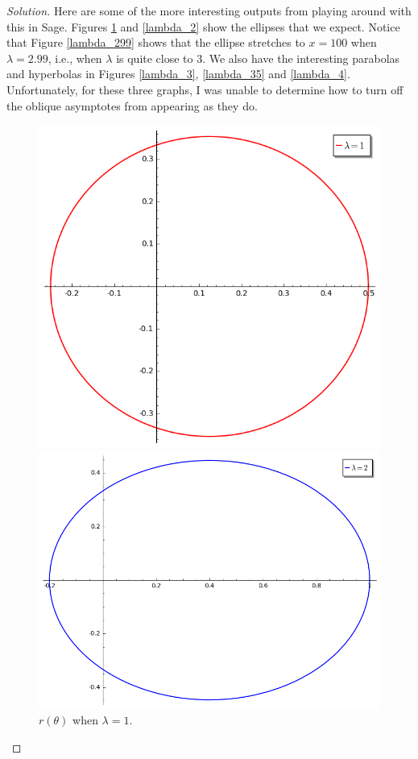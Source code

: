 \documentclass[letterpaper, 12pt]{amsart}
\theoremstyle{definition}  							%
\begin{document}
		\begin{proof}[Solution]
		Here are some of the more interesting outputs from playing around with this in Sage.
		Figures \ref{lambda_1} and \ref{lambda_2} show the ellipses that we expect.
		Notice that Figure \ref{lambda_299} shows that the ellipse stretches to $x=100$ when $\lambda = 2.99$, i.e., when $\lambda$ is quite close to 3.
		We also have the interesting parabolas and hyperbolas in Figures \ref{lambda_3}, \ref{lambda_35} and \ref{lambda_4}.
		Unfortunately, for these three graphs, I was unable to determine how to turn off the oblique asymptotes from appearing as they do.

		\begin{figure}[b]
			\centering
			\begin{minipage}[b]{.4\textwidth}
				\includegraphics[scale=0.38]{images/lambda1.png}
				\caption{$r(\theta)$ when $\lambda = 1$.}
				\label{lambda_1}
			\end{minipage}
			\qquad
			\begin{minipage}[b]{.4\textwidth}
				\includegraphics[scale=0.38]{images/lambda2.png}

\end{minipage}
\end{figure}
\end{proof}
\end{document}
